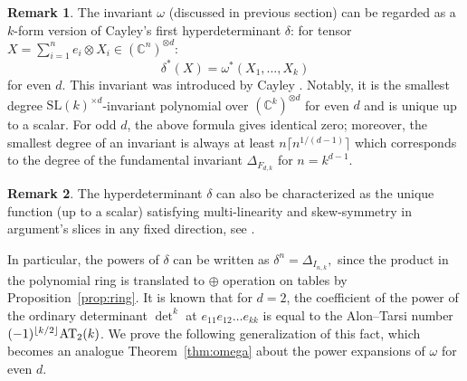 \documentclass[12pt, reqno]{amsart}
\theoremstyle{definition}
\newtheorem{remark}{Remark}[section]
\DeclarePairedDelimiter\floor{\lfloor}{\rfloor}
\begin{document}
\begin{remark}\label{remark:hdet}
    The invariant $\omega$ (discussed in previous section) can be regarded as a $k$-form version of Cayley's first hyperdeterminant $\delta$: for tensor $X = \sum_{i=1}^n e_i \otimes X_i \in (\mathbb{C}^n)^{\otimes d}$:
$$
    \delta^*(X) = \omega^*(X_1, \ldots, X_k)
$$
for %
even $d$. This invariant was introduced by Cayley \cite{cay,cay2}. %
Notably, it is the smallest degree $\mathrm{SL}(k)^{\times d}$-invariant polynomial over $(\mathbb{C}^k)^{\otimes d}$ for even $d$ and is unique up to a scalar. For odd $d$, the above formula gives identical zero; moreover, the smallest degree of an invariant is always at least $n\lceil n^{1/(d-1)} \rceil$ \cite{ayfund} which corresponds to the degree of the fundamental invariant $\Delta_{F_{d,k}}$ for $n = k^{d-1}$. %
\end{remark}



\begin{remark}
The hyperdeterminant $\delta$ can also be characterized as the unique function (up to a scalar) satisfying multi-linearity and skew-symmetry in argument's slices in any fixed direction, see \cite{ayhdet}.
\end{remark} 

In particular, the powers of $\delta$ can be written as
$
    \delta^n = \Delta_{I_{n,k}},
$
since the product in the polynomial ring is translated to $\oplus$ operation on tables by Proposition~\ref{prop:ring}. It is known that for $d = 2$, the coefficient of the power of the ordinary determinant $\det^k$ at $e_{11}e_{12}\ldots e_{kk}$ is equal to the Alon--Tarsi number $(-1)^{\floor{k/2}}\mathrm{AT}_2(k)$. %
 We prove the following generalization of this fact, which becomes an analogue Theorem~\ref{thm:omega} about the power expansions of $\omega$ for even $d$. %
\end{document}
